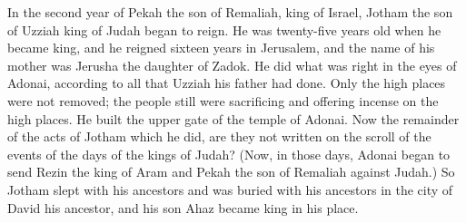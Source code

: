 \begin{biblechapter}
 In the second year of Pekah the son of Remaliah, king of Israel, Jotham the son of Uzziah king of Judah began to reign.
\verse He was twenty-five years old when he became king, and he reigned sixteen years in Jerusalem, and the name of his mother was Jerusha the daughter of Zadok.
\verse He did what was right in the eyes of Adonai, according to all that Uzziah his father had done.
\verse Only the high places were not removed; the people still were sacrificing and offering incense on the high places. He built the upper gate of the temple of Adonai.
\verse Now the remainder of the acts of Jotham which he did, are they not written on the scroll of the events of the days of the kings of Judah?
\verse (Now, in those days, Adonai began to send Rezin the king of Aram and Pekah the son of Remaliah against Judah.)
\verse So Jotham slept with his ancestors and was buried with his ancestors in the city of David his ancestor, and his son Ahaz became king in his place.
\end{biblechapter}

